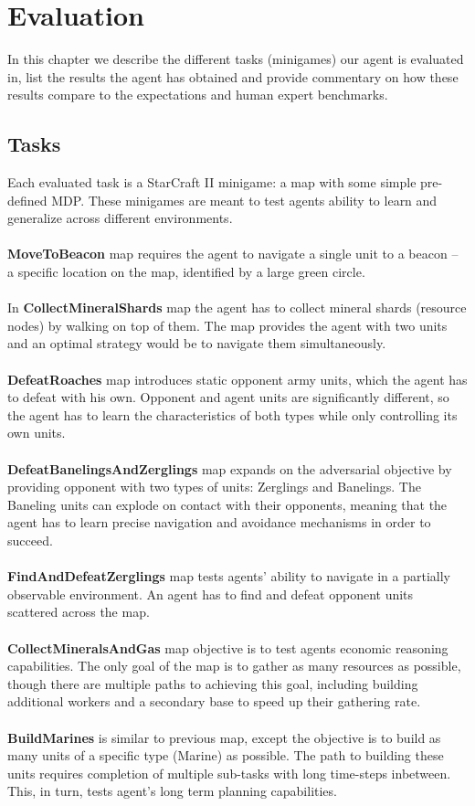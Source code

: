 \chapter{Evaluation}

In this chapter we describe the different tasks (minigames) our agent is evaluated in, list the results the agent has obtained and provide commentary on how these results compare to the expectations and human expert benchmarks.

\section{Tasks}

Each evaluated task is a StarCraft II minigame: a map with some simple pre-defined MDP. These minigames are meant to test agents ability to learn and generalize across different environments.
\\\\
\textbf{MoveToBeacon} map requires the agent to navigate a single unit to a beacon -- a specific location on the map, identified by a large green circle.
\\\\
In \textbf{CollectMineralShards} map the agent has to collect mineral shards (resource nodes) by walking on top of them. The map provides the agent with two units and an optimal strategy would be to navigate them simultaneously.
\\\\
\textbf{DefeatRoaches} map introduces static opponent army units, which the agent has to defeat with his own. Opponent and agent units are significantly different, so the agent has to learn the characteristics of both types while only controlling its own units.
\\\\
\textbf{DefeatBanelingsAndZerglings} map expands on the adversarial objective by providing opponent with two types of units: Zerglings and Banelings. The Baneling units can explode on contact with their opponents, meaning that the agent has to learn precise navigation and avoidance mechanisms in order to succeed.
\\\\
\textbf{FindAndDefeatZerglings} map tests agents' ability to navigate in a partially observable environment. An agent has to find and defeat opponent units scattered across the map.
\\\\
\textbf{CollectMineralsAndGas} map objective is to test agents economic reasoning capabilities. The only goal of the map is to gather as many resources as possible, though there are multiple paths to achieving this goal, including building additional workers and a secondary base to speed up their gathering rate. 
\\\\
\textbf{BuildMarines} is similar to previous map, except the objective is to build as many units of a specific type (Marine) as possible. The path to building these units requires completion of multiple sub-tasks with long time-steps inbetween. This, in turn, tests agent's long term planning capabilities.

